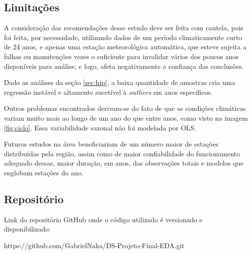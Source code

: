 \documentclass[pdflatex,sn-mathphys-num]{sn-jnl}%
\theoremstyle{thmstyleone}%
\theoremstyle{thmstyletwo}%
\theoremstyle{thmstylethree}%
\begin{document}
\subsection{Limitações}

A consideração das recomendações desse estudo deve ser feita com cautela, pois foi feita, por necessidade, utilizando dados de um período climaticamente curto de 24 anos, e apenas uma estação meteorológica automática, que esteve sujeita a falhas ou manutenções vezes o suficiente para invalidar vários dos poucos anos disponíveis para análise, e logo, afeta negativamente a confiança das conclusões.

Dado as análises da seção \ref{sec:hip}, a baixa quantidade de amostras cria uma regressão instável e altamente sucetível à \textit{outliers} em anos específicos.

Outros problemas encontrados derivam-se do fato de que as condições climáticas variam muito mais ao longo de um ano do que entre anos, como visto na imagem \ref{fig:ciclo}. Essa variabilidade sazonal não foi modelada por OLS.

Futuros estudos na área beneficiariam de um número maior de estações distribuídas pela região, assim como de maior confiabilidade do funcionamento adequado dessas, maior duração, em anos, das observações totais e modelos que englobam estações do ano.


\clearpage


\begin{appendices}

\section{Repositório}\label{secA1}

Link do repositório GitHub onde o código utilizado é versionado e disponibilizado:

https://github.com/GabrielNaka/DS-Projeto-Final-EDA.git




\end{appendices}
\end{document}
